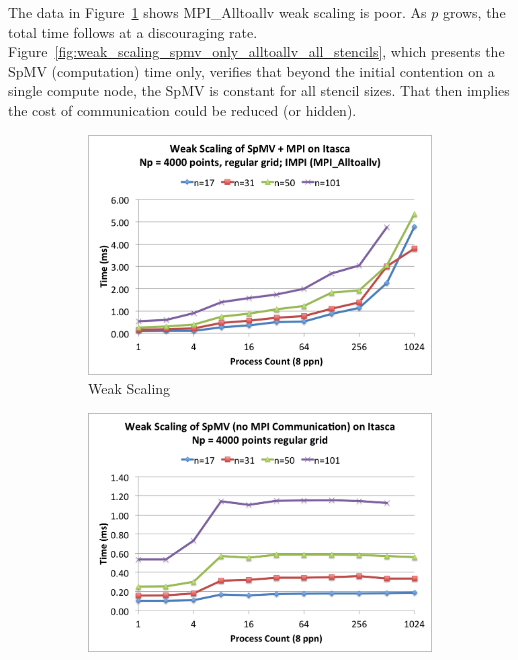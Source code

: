 \documentclass{report}
\begin{document}
The data in Figure~\ref{fig:weak_scaling_comm_only_alltoallv_all_stencils} shows MPI\_Alltoallv weak scaling is poor. As $p$ grows, the total time follows at a discouraging rate. Figure~\ref{fig:weak_scaling_spmv_only_alltoallv_all_stencils}, which presents the SpMV (computation) time only, verifies that beyond the initial contention on a single compute node, the SpMV is constant for all stencil sizes. That then implies the cost of communication could be reduced (or hidden). 

\begin{figure}
\centering
\begin{subfigure}{0.48\textwidth}
\centering
\includegraphics[width=\textwidth]{performance_content/scaling/weak_scaling_np4000_regular_alltoallv.png}\caption{Weak Scaling}
\label{fig:weak_scaling_comm_only_alltoallv_all_stencils}
\end{subfigure}
\begin{subfigure}{0.48\textwidth}
\centering
\includegraphics[width=\textwidth]{performance_content/scaling/weak_scaling_np4000_regular_spmvOnly.png}

\end{subfigure}
\end{figure}
\end{document}

